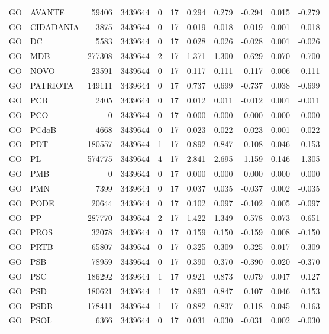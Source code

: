 \begin{landscape}
\begin{longtable}{llrrrrrrrrr}
GO & AVANTE & 59406 & 3439644 & 0 & 17 & 0.294 & 0.279 & -0.294 & 0.015 & -0.279 \\
GO & CIDADANIA & 3875 & 3439644 & 0 & 17 & 0.019 & 0.018 & -0.019 & 0.001 & -0.018 \\
GO & DC & 5583 & 3439644 & 0 & 17 & 0.028 & 0.026 & -0.028 & 0.001 & -0.026 \\
GO & MDB & 277308 & 3439644 & 2 & 17 & 1.371 & 1.300 & 0.629 & 0.070 & 0.700 \\
GO & NOVO & 23591 & 3439644 & 0 & 17 & 0.117 & 0.111 & -0.117 & 0.006 & -0.111 \\
GO & PATRIOTA & 149111 & 3439644 & 0 & 17 & 0.737 & 0.699 & -0.737 & 0.038 & -0.699 \\
GO & PCB & 2405 & 3439644 & 0 & 17 & 0.012 & 0.011 & -0.012 & 0.001 & -0.011 \\
GO & PCO & 0 & 3439644 & 0 & 17 & 0.000 & 0.000 & 0.000 & 0.000 & 0.000 \\
GO & PCdoB & 4668 & 3439644 & 0 & 17 & 0.023 & 0.022 & -0.023 & 0.001 & -0.022 \\
GO & PDT & 180557 & 3439644 & 1 & 17 & 0.892 & 0.847 & 0.108 & 0.046 & 0.153 \\
GO & PL & 574775 & 3439644 & 4 & 17 & 2.841 & 2.695 & 1.159 & 0.146 & 1.305 \\
GO & PMB & 0 & 3439644 & 0 & 17 & 0.000 & 0.000 & 0.000 & 0.000 & 0.000 \\
GO & PMN & 7399 & 3439644 & 0 & 17 & 0.037 & 0.035 & -0.037 & 0.002 & -0.035 \\
GO & PODE & 20644 & 3439644 & 0 & 17 & 0.102 & 0.097 & -0.102 & 0.005 & -0.097 \\
GO & PP & 287770 & 3439644 & 2 & 17 & 1.422 & 1.349 & 0.578 & 0.073 & 0.651 \\
GO & PROS & 32078 & 3439644 & 0 & 17 & 0.159 & 0.150 & -0.159 & 0.008 & -0.150 \\
GO & PRTB & 65807 & 3439644 & 0 & 17 & 0.325 & 0.309 & -0.325 & 0.017 & -0.309 \\
GO & PSB & 78959 & 3439644 & 0 & 17 & 0.390 & 0.370 & -0.390 & 0.020 & -0.370 \\
GO & PSC & 186292 & 3439644 & 1 & 17 & 0.921 & 0.873 & 0.079 & 0.047 & 0.127 \\
GO & PSD & 180621 & 3439644 & 1 & 17 & 0.893 & 0.847 & 0.107 & 0.046 & 0.153 \\
GO & PSDB & 178411 & 3439644 & 1 & 17 & 0.882 & 0.837 & 0.118 & 0.045 & 0.163 \\
GO & PSOL & 6366 & 3439644 & 0 & 17 & 0.031 & 0.030 & -0.031 & 0.002 & -0.030 \\

\end{longtable}
\end{landscape}
